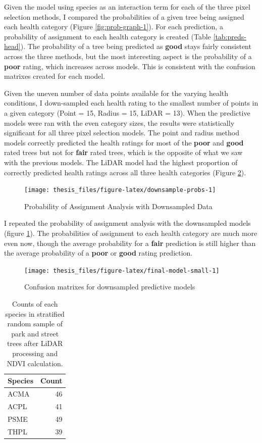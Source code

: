 \documentclass[12pt,twoside]{reedthesis}
\begin{document}
Given the model using species as an interaction term for each of the three pixel selection methods, I compared the probabilities of a given tree being assigned each health category (Figure \ref{fig:prob-graph-1}). For each prediction, a probability of assignment to each health category is created (Table \ref{tab:preds-head}).
The probability of a tree being predicted as \textbf{good} stays fairly consistent across the three methods, but the most interesting aspect is the probability of a \textbf{poor} rating, which increases across models. This is consistent with the confusion matrixes created for each model.

Given the uneven number of data points available for the varying health conditions, I down-sampled each health rating to the smallest number of points in a given category (Point = 15, Radius = 15, LiDAR = 13). When the predictive models were ran with the even category sizes, the results were statistically significant for all three pixel selection models. The point and radius method models correctly predicted the health ratings for most of the \textbf{poor} and \textbf{good} rated trees but not for \textbf{fair} rated trees, which is the opposite of what we saw with the previous models. The LiDAR model had the highest proportion of correctly predicted health ratings across all three health categories (Figure \ref{fig:final-model-small}).
\begin{figure}

{\centering \texttt{[image: thesis\_files/figure-latex/downsample-probs-1]} 

}

\caption{Probability of Assignment Analysis with Downsampled Data}\label{fig:downsample-probs}
\end{figure}
I repeated the probability of assignment analysis with the downsampled models (figure \ref{fig:downsample-probs}). The probabilities of assignment to each health category are much more even now, though the average probability for a \textbf{fair} prediction is still higher than the average probability of a \textbf{poor} or \textbf{good} rating prediction.
\begin{figure}

{\centering \texttt{[image: thesis\_files/figure-latex/final-model-small-1]} 

}

\caption{Confusion matrixes for downsampled predictive models}\label{fig:final-model-small}
\end{figure}
\begin{longtable}[t]{lr}
\caption[Species counts post LiDAR processing]{\label{tab:final-lidar-counts}Counts of each species in stratified random sample of park and street trees after LiDAR processing and NDVI calculation.}\\
\toprule
Species & Count\\
\midrule
ACMA & 46\\
ACPL & 41\\
PSME & 49\\
THPL & 39\\
\bottomrule
\end{longtable}
\end{document}
